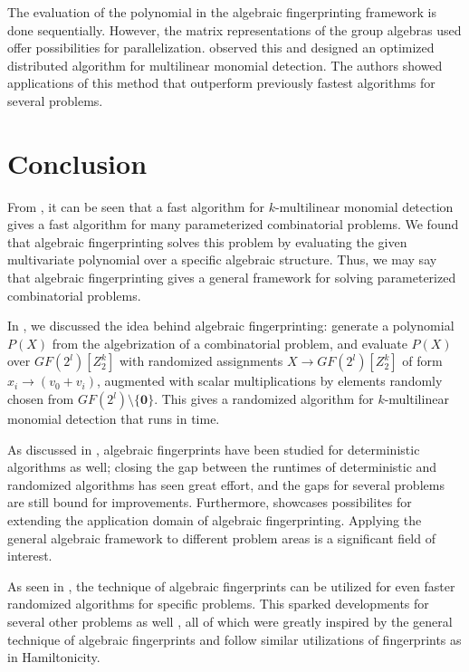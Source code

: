 The evaluation of the polynomial in the algebraic fingerprinting framework is done sequentially. 
However, the matrix representations of the group algebras used 
offer possibilities for parallelization. \textcite{Midas19} observed this and designed 
an optimized distributed algorithm for multilinear monomial detection. 
The authors showed applications of this method that outperform previously 
fastest algorithms for several  problems.

\section{Conclusion}
\label{sect:conclusion}

From , 
it can be seen  
that a fast algorithm for $k$-multilinear monomial detection gives a 
fast algorithm for many parameterized combinatorial problems. 
We found that algebraic fingerprinting solves this problem by 
evaluating the given multivariate polynomial over a specific algebraic structure. 
Thus, we 
may say that algebraic fingerprinting gives a general framework for solving 
parameterized combinatorial problems. 

In , we discussed the idea behind 
algebraic fingerprinting: generate a polynomial $P(X)$ from the algebrization of 
a combinatorial problem, and evaluate $P(X)$ over $GF(2^{l})[Z_2^k]$ with 
randomized assignments $X \to GF(2^{l})[Z_2^k]$ of form 
$x_i \to (v_0 + v_i)$, augmented with scalar multiplications 
by elements randomly chosen from $GF(2^{l}) \setminus \{\mathbf{0}\}$. 
This gives a randomized algorithm for 
$k$-multilinear monomial detection that runs in  time.

As discussed in , algebraic fingerprints 
have been studied for deterministic algorithms as well; closing 
the gap between the runtimes of deterministic and randomized algorithms 
has seen great effort, and the gaps for several problems are still bound for improvements.
Furthermore,  showcases possibilites for extending the 
application domain of algebraic fingerprinting. Applying the general algebraic framework 
to different problem areas is a significant field of interest.

As seen in , 
the technique of algebraic fingerprints can be utilized for even 
faster randomized algorithms for specific problems. 
This sparked developments for several other 
problems as well \cite{Björklund17}, all of which were greatly inspired by 
the general technique of algebraic fingerprints and 
follow similar utilizations of fingerprints as in Hamiltonicity.

